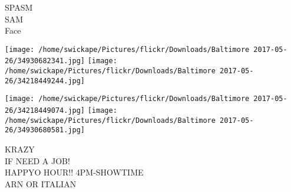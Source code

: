 \documentclass[10pt,letterpaper]{article}
\begin{document}
SPASM\\
SAM\\
Face
\pagebreak

\texttt{[image: /home/swickape/Pictures/flickr/Downloads/Baltimore 2017-05-26/34930682341.jpg]}
\texttt{[image: /home/swickape/Pictures/flickr/Downloads/Baltimore 2017-05-26/34218449244.jpg]}

\texttt{[image: /home/swickape/Pictures/flickr/Downloads/Baltimore 2017-05-26/34218449074.jpg]}
\texttt{[image: /home/swickape/Pictures/flickr/Downloads/Baltimore 2017-05-26/34930680581.jpg]}

KRAZY\\
IF NEED A JOB!\\
HAPPYO HOUR!! 4PM{-}SHOWTIME\\
ARN OR ITALIAN
\pagebreak
\end{document}
